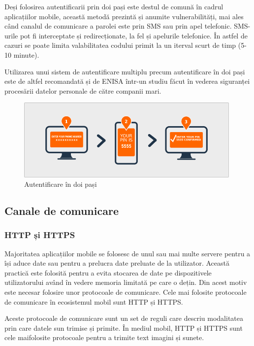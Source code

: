 \documentclass[12pt]{article}
\begin{document}
Deși folosirea autentificarii prin doi pași este destul de comună în cadrul aplicațiilor mobile, această metodă
prezintă și anumite vulnerabilități, mai ales când canalul de comunicare a parolei este prin SMS sau prin 
apel telefonic.
SMS-urile pot fi interceptate și redirecționate, la fel și apelurile telefonice. În astfel de cazuri
se poate limita valabilitatea codului primit la un iterval scurt de timp (5-10 minute). 

Utilizarea unui sistem de autentificare multiplu precum autentificare în doi pași este de altfel recomandată
și de ENISA \cite{enisa-security-data-processing} într-un studiu făcut în vederea 
siguranței procesării datelor personale de către companii mari.

\begin{figure}[H]
\centering
\includegraphics[height=4cm]{wordpress-two-factor-authentication.png}
\caption{Autentificare în doi pași}
\end{figure}

\subsection{Canale de comunicare}
\subsubsection{HTTP și HTTPS}

Majoritatea aplicațiilor mobile se folosesc de unul sau mai multe servere pentru a își aduce date
sau pentru a prelucra date preluate de la utilizator. Această practică este folosită pentru a evita  stocarea de
date pe dispozitivele utilizatorului având în vedere memoria limitată pe care o dețin. Din acest motiv 
este necesar folosire unor protocoale de comunicare. Cele mai folosite protocoale de comunicare în ecosistemul
mobil sunt HTTP și HTTPS.

Aceste protocoale de comunicare sunt un set de reguli care descriu modalitatea prin care datele sun trimise și 
primite. În mediul mobil, HTTP și HTTPS sunt cele maifolosite protocoale pentru a trimite text imagini și sunete.
\end{document}
